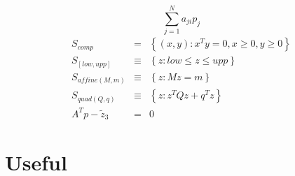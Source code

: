\documentclass{article}
\begin{document}
\begin{equation*}
\sum_{j=1}^{N}a_{ji}p_{j}
\end{equation*}%
\begin{eqnarray*}
S_{comp} &=&\left\{ \left( x,y\right) :x^{T}y=0,x\geq 0,y\geq 0\right\} \\
S_{\left[ low,upp\right] } &\equiv &\left\{ z:low\leq z\leq upp\right\} \\
S_{affine\left( M,m\right) } &\equiv &\left\{ z:Mz=m\right\} \\
S_{quad\left( Q,q\right) } &\equiv &\left\{ z:z^{T}Qz+q^{T}z\right\} \\
A^{T}p-\tilde{z}_{3} &=&0
\end{eqnarray*}

\section{Useful}
\end{document}
